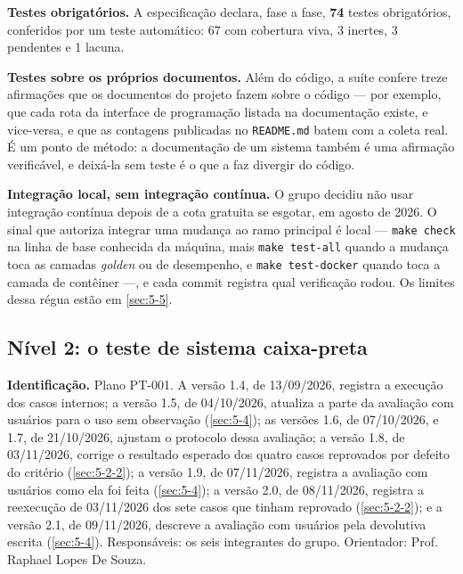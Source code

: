 \textbf{Testes obrigatórios.} A especificação declara, fase a fase, \textbf{74} testes obrigatórios, conferidos por um teste automático: 67 com cobertura viva, 3 inertes, 3 pendentes e 1 lacuna.


\textbf{Testes sobre os próprios documentos.} Além do código, a suíte confere treze afirmações que os documentos do projeto fazem sobre o código --- por exemplo, que cada rota da interface de programação listada na documentação existe, e vice-versa, e que as contagens publicadas no \texttt{README.\allowbreak{}md} batem com a coleta real. É um ponto de método: a documentação de um sistema também é uma afirmação verificável, e deixá-la sem teste é o que a faz divergir do código.


\textbf{Integração local, sem integração contínua.} O grupo decidiu não usar integração contínua depois de a cota gratuita se esgotar, em agosto de 2026. O sinal que autoriza integrar uma mudança ao ramo principal é local --- \texttt{make check} na linha de base conhecida da máquina, mais \texttt{make test-\allowbreak{}all} quando a mudança toca as camadas \textit{golden} ou de desempenho, e \texttt{make test-\allowbreak{}docker} quando toca a camada de contêiner ---, e cada commit registra qual verificação rodou. Os limites dessa régua estão em \ref{sec:5-5}.


\subsection{Nível 2: o teste de sistema caixa-preta}\label{sec:5-1-3}

\textbf{Identificação.} Plano PT-001. A versão 1.4, de 13/09/2026, registra a execução dos casos internos; a versão 1.5, de 04/10/2026, atualiza a parte da avaliação com usuários para o uso sem observação (\ref{sec:5-4}); as versões 1.6, de 07/10/2026, e 1.7, de 21/10/2026, ajustam o protocolo dessa avaliação; a versão 1.8, de 03/11/2026, corrige o resultado esperado dos quatro casos reprovados por defeito do critério (\ref{sec:5-2-2}); a versão 1.9, de 07/11/2026, registra a avaliação com usuários como ela foi feita (\ref{sec:5-4}); a versão 2.0, de 08/11/2026, registra a reexecução de 03/11/2026 dos sete casos que tinham reprovado (\ref{sec:5-2-2}); e a versão 2.1, de 09/11/2026, descreve a avaliação com usuários pela devolutiva escrita (\ref{sec:5-4}). Responsáveis: os seis integrantes do grupo. Orientador: Prof. Raphael Lopes De Souza.

